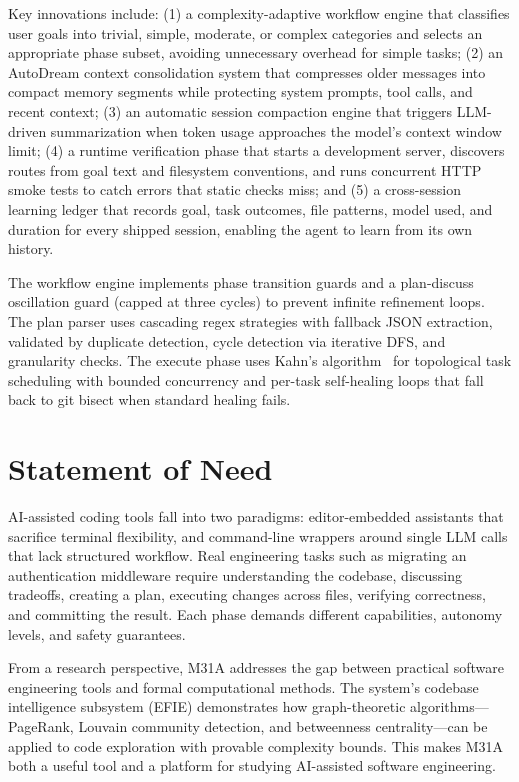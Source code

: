 \documentclass[11pt]{article}
\begin{document}
Key innovations include: (1) a complexity-adaptive workflow engine that classifies user goals into trivial, simple, moderate, or complex categories and selects an appropriate phase subset, avoiding unnecessary overhead for simple tasks; (2) an AutoDream context consolidation system that compresses older messages into compact memory segments while protecting system prompts, tool calls, and recent context; (3) an automatic session compaction engine that triggers LLM-driven summarization when token usage approaches the model's context window limit; (4) a runtime verification phase that starts a development server, discovers routes from goal text and filesystem conventions, and runs concurrent HTTP smoke tests to catch errors that static checks miss; and (5) a cross-session learning ledger that records goal, task outcomes, file patterns, model used, and duration for every shipped session, enabling the agent to learn from its own history.

The workflow engine implements phase transition guards and a plan-discuss oscillation guard (capped at three cycles) to prevent infinite refinement loops. The plan parser uses cascading regex strategies with fallback JSON extraction, validated by duplicate detection, cycle detection via iterative DFS, and granularity checks. The execute phase uses Kahn's algorithm~\cite{kahn1962} for topological task scheduling with bounded concurrency and per-task self-healing loops that fall back to git bisect when standard healing fails.

\section{Statement of Need}

AI-assisted coding tools fall into two paradigms: editor-embedded assistants that sacrifice terminal flexibility, and command-line wrappers around single LLM calls that lack structured workflow. Real engineering tasks such as migrating an authentication middleware require understanding the codebase, discussing tradeoffs, creating a plan, executing changes across files, verifying correctness, and committing the result. Each phase demands different capabilities, autonomy levels, and safety guarantees.

From a research perspective, M31A addresses the gap between practical software engineering tools and formal computational methods. The system's codebase intelligence subsystem (EFIE) demonstrates how graph-theoretic algorithms---PageRank, Louvain community detection, and betweenness centrality---can be applied to code exploration with provable complexity bounds. This makes M31A both a useful tool and a platform for studying AI-assisted software engineering.
\end{document}
